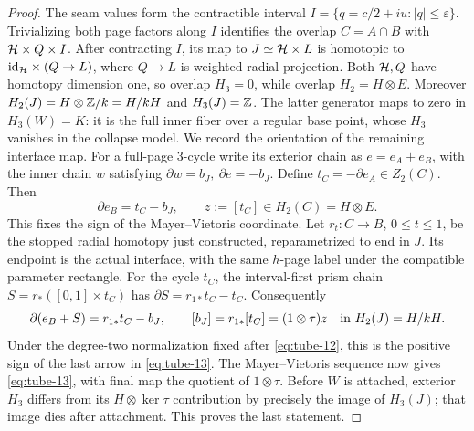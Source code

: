 \begin{proof}
The seam values form the contractible interval
\(I=\{q=c/2+iu:|q|\le\varepsilon\}\).
Trivializing both page factors along \(I\) identifies the overlap
\(C=A\cap B\) with \(\mathcal H\times Q\times I\).
After contracting \(I\), its map to \(J\simeq\mathcal H\times L\)
is homotopic to \(\mathrm{id}_{\mathcal H}\times(Q\to L)\), where
\(Q\to L\) is weighted radial projection.
Both \(\mathcal H,Q\) have homotopy dimension one, so overlap
\(H_3=0\), while overlap \(H_2=H\otimes E\).
Moreover \(H_2(J)=H\otimes\mathbb Z/k=H/kH\) and
\(H_3(J)=\mathbb Z\). The latter generator maps to zero in
\(H_3(W)=K\): it is the full inner fiber over a regular
base point, whose \(H_3\) vanishes in the collapse model.
We record the orientation of the remaining interface map.
For a full-page
3-cycle write its exterior chain as \(e=e_A+e_B\), with
the inner chain \(w\) satisfying
\(\partial w=b_J,\ \partial e=-b_J\).
Define \(t_C=-\partial e_A\in Z_2(C)\). Then
\begin{equation}
\partial e_B=t_C-b_J,\qquad
z:=[t_C]\in H_2(C)=H\otimes E.
\label{eq:mv-cut-chain}
\end{equation}
This fixes the sign of the Mayer--Vietoris coordinate.
Let \(r_t:C\to B\), \(0\le t\le1\), be the stopped radial
homotopy just constructed, reparametrized to end in \(J\).
Its endpoint is the actual interface, with the same \(h\)-page
label under the compatible parameter rectangle. For the
cycle \(t_C\), the interval-first prism chain
\(S=r_*([0,1]\times t_C)\) has
\(\partial S=r_{1*}t_C-t_C\). Consequently
\begin{equation}
\partial(e_B+S)=r_{1*}t_C-b_J,\qquad
[b_J]=r_{1*}[t_C]
     =(1\otimes\tau)z\quad\hbox{in }H_2(J)=H/kH.
\label{eq:mv-strip}
\end{equation}
Under the degree-two normalization fixed after
\eqref{eq:tube-12}, this is the positive sign of the last arrow
in \eqref{eq:tube-13}.
The Mayer--Vietoris sequence now gives \eqref{eq:tube-13}, with final
map the quotient of \(1\otimes\tau\). Before \(W\) is
attached, exterior \(H_3\) differs from its
\(H\otimes\ker\tau\) contribution by precisely the image
of \(H_3(J)\); that image dies after attachment. This
proves the last statement.
\end{proof}
